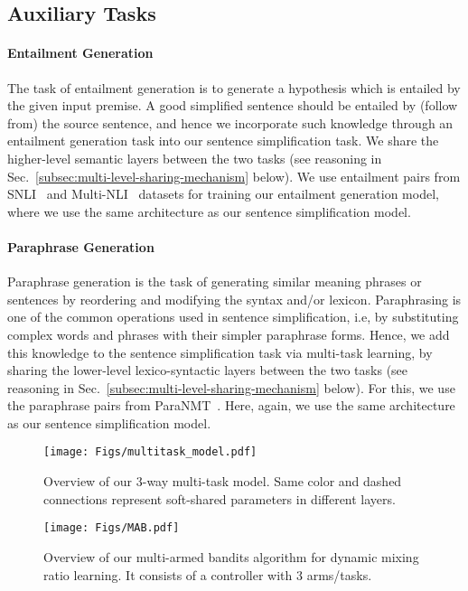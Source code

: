 \documentclass[11pt]{article}
\begin{document}
\subsection{Auxiliary Tasks}

\paragraph{Entailment Generation} 
The task of entailment generation is to generate a hypothesis which is entailed by the given input premise. A good simplified sentence should be entailed by (follow from) the source sentence, and hence we incorporate such knowledge through an entailment generation task into our sentence simplification task. We share the higher-level semantic layers between the two tasks (see reasoning in Sec.~\ref{subsec:multi-level-sharing-mechanism} below). We use entailment pairs from SNLI~\cite{bowman2016snli} and Multi-NLI~\cite{williams2017broad} datasets for training our entailment generation model, where we use the same architecture as our sentence simplification model.



\paragraph{Paraphrase Generation} 
Paraphrase generation is the task of generating similar meaning phrases or sentences by reordering and modifying the syntax and/or lexicon. Paraphrasing is one of the common operations used in sentence simplification, i.e, by substituting complex words and phrases with their simpler paraphrase forms. Hence, we add this knowledge to the sentence simplification task via multi-task learning, by sharing the lower-level lexico-syntactic layers between the two tasks (see reasoning in Sec.~\ref{subsec:multi-level-sharing-mechanism} below). For this, we use the paraphrase pairs from ParaNMT~\cite{Wieting2017PushingTL}. Here, again, we use the same architecture as our sentence simplification model.


\begin{figure}
\centering
\begin{minipage}[t]{.48\linewidth}
\centering
\texttt{[image: Figs/multitask\_model.pdf]}
\vspace{-10pt}
\caption{Overview of our 3-way multi-task model. Same color and dashed connections represent soft-shared parameters in different layers.
}
\vspace{-10pt}
\label{fig:multitask}
\end{minipage}
\hfill
\begin{minipage}[t]{.48\linewidth}
\centering
\texttt{[image: Figs/MAB.pdf]}
\vspace{-10pt}
\caption{Overview of our multi-armed bandits algorithm for dynamic mixing ratio learning. It consists of a controller with 3 arms/tasks.
}
\vspace{-10pt}
\label{fig:mab}
\end{minipage}
\end{figure}
\end{document}
